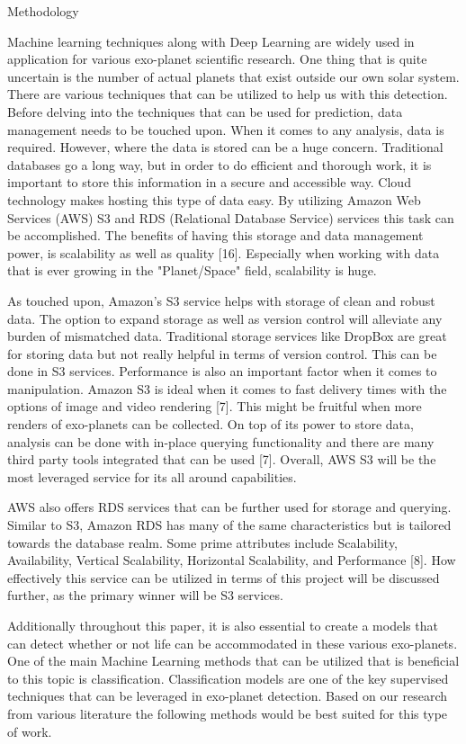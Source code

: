 Methodology

Machine learning techniques along with Deep Learning are widely used in application for various exo-planet scientific research. One thing that is quite uncertain is the number of actual planets that exist outside our own solar system. There are various techniques that can be utilized to help us with this detection. Before delving into the techniques that can be used for prediction, data management needs to be touched upon. When it comes to any analysis, data is required. However, where the data is stored can be a huge concern. Traditional databases go a long way, but in order to do efficient and thorough work, it is important to store this information in a secure and accessible way. Cloud technology makes hosting this type of data easy. By utilizing Amazon Web Services (AWS) S3 and RDS (Relational Database Service) services this task can be accomplished. The benefits of having this storage and data management power, is scalability as well as quality [16]. Especially when working with data that is ever growing in the "Planet/Space" field, scalability is huge. 

As touched upon, Amazon's S3 service helps with storage of clean and robust data. The option to expand storage as well as version control will alleviate any burden of mismatched data. Traditional storage services like DropBox are great for storing data but not really helpful in terms of version control. This can be done in S3 services. Performance is also an important factor when it comes to manipulation. Amazon S3 is ideal when it comes to fast delivery times with the options of image and video rendering [7]. This might be fruitful when more renders of exo-planets can be collected. On top of its power to store data, analysis can be done with in-place querying functionality and there are many third party tools integrated that can be used [7]. Overall, AWS S3 will be the most leveraged service for its all around capabilities.

AWS also offers RDS services that can be further used for storage and querying. Similar to S3, Amazon RDS has many of the same characteristics but is tailored towards the database realm. Some prime attributes include Scalability, Availability, Vertical Scalability, Horizontal Scalability, and Performance [8]. How effectively this service can be utilized in terms of this project will be discussed further, as the primary winner will be S3 services. 

Additionally throughout this paper, it is also essential to create a models that can detect whether or not life can be accommodated in these various exo-planets. One of the main Machine Learning methods that can be utilized that is beneficial to this topic is classification. Classification models are one of the key supervised techniques that can be leveraged in exo-planet detection. Based on our research from various literature the following methods would be best suited for this type of work. 

